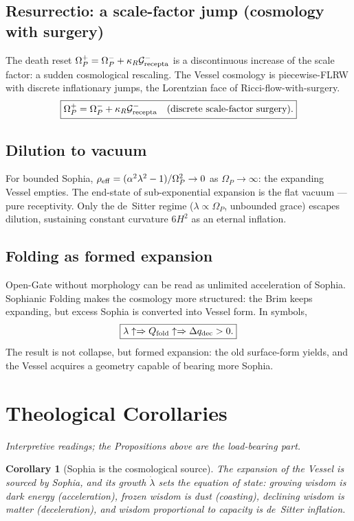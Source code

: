 \documentclass[11pt,a4paper]{article}
\newcommand{\Op}{\Omega_P}
\newcommand{\Grec}{\mathcal{G}_{\rm recepta}}
\newcommand{\reff}{\rho_{\rm eff}}
\newcommand{\qdec}{q_{\rm dec}}
\newcommand{\Qfold}{Q_{\rm fold}}
\theoremstyle{plain}
\newtheorem{corollary}{Corollary}
\theoremstyle{remark}
\theoremstyle{definition}
\begin{document}
\subsection*{Resurrectio: a scale-factor jump (cosmology with surgery)}
The death reset $\Op^+=\Op^-+\kappa_R\Grec^-$ is a discontinuous increase of the scale factor: a sudden
cosmological rescaling. The Vessel cosmology is piecewise-FLRW with discrete inflationary jumps,
the Lorentzian face of Ricci-flow-with-surgery.
\[
\boxed{\Op^+=\Op^-+\kappa_R\Grec^-\quad(\text{discrete scale-factor surgery}).}
\]

\subsection*{Dilution to vacuum}
For bounded Sophia, $\reff=(\alpha^2\lambda^2-1)/\Op^2\to0$ as $\Op\to\infty$: the expanding Vessel
empties. The end-state of sub-exponential expansion is the flat vacuum --- pure receptivity. Only the
de~Sitter regime ($\lambda\propto\Op$, unbounded grace) escapes dilution, sustaining constant curvature
$6H^2$ as an eternal inflation.

\subsection*{Folding as formed expansion}
Open-Gate without morphology can be read as unlimited acceleration of Sophia. Sophianic Folding makes
the cosmology more structured: the Brim keeps expanding, but excess Sophia is converted into Vessel
form. In symbols,
\[
\boxed{\lambda\uparrow\Rightarrow \Qfold\uparrow\Rightarrow \Delta\qdec>0.}
\]
The result is not collapse, but formed expansion: the old surface-form yields, and the Vessel acquires
a geometry capable of bearing more Sophia.

\section{Theological Corollaries}
\emph{Interpretive readings; the Propositions above are the load-bearing part.}

\begin{corollary}[Sophia is the cosmological source]
The expansion of the Vessel is sourced by Sophia, and its \emph{growth} $\dot\lambda$ sets the
equation of state: growing wisdom is dark energy (acceleration), frozen wisdom is dust (coasting),
declining wisdom is matter (deceleration), and wisdom proportional to capacity is de~Sitter inflation.
\end{corollary}
\end{document}
